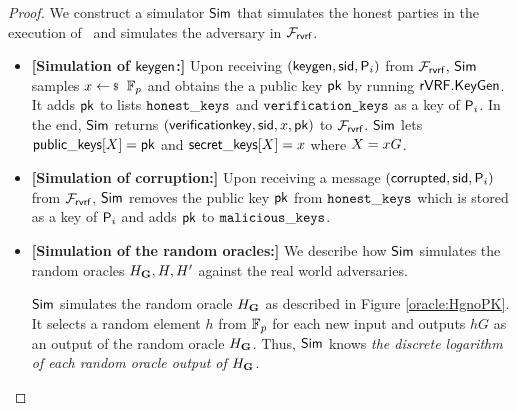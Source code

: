 \begin{proof}
	We construct a simulator $ \mathsf{Sim} $ that simulates the honest parties in the execution of \name \ and simulates the adversary in $ \mathcal{F}_{\textsf{rvrf}} $. 
	\begin{itemize}
		
		\item \textbf{[Simulation of $ \mathsf{keygen} $:]} Upon receiving $(\mathsf{keygen}, \textsf{sid}, \mathsf{P}_i)$ from $\mathcal{F}_{\textsf{rvrf}}$, $ \mathsf{Sim} $ samples $x \leftsample \FF_p$ and obtains the a public key $ \mathsf{pk} $ by running $ {\mathsf{rVRF}}.{\mathsf{KeyGen}} $. It adds $ \mathsf{pk} $ to lists $ \mathtt{honest\_keys} $ and $ \texttt{verification\_keys} $ as a key of $ \mathsf{P}_i $. 
		In the end, $ \mathsf{Sim} $ returns $(\mathsf{verificationkey}, \textsf{sid}, x,\mathsf{pk})$ to $\mathcal{F}_{\textsf{rvrf}}$. 
		$ \mathsf{Sim} $ lets  $ {\mathsf{public\_keys}}[X] = \mathsf{pk}$ and $ {\mathsf{secret\_keys}}[X] =x $ where $ X = x G $.
		
		\item \textbf{[Simulation of corruption:]} Upon receiving a message $ (\mathsf{corrupted}, \textsf{sid}, \mathsf{P}_i) $ from $ \mathcal{F}_{\textsf{rvrf}} $, $ \mathsf{Sim} $ removes the public key $ \mathsf{pk} $ from $ \mathtt{honest\_keys} $ which is stored as a key of $ \mathsf{P}_i $ and adds $ \mathsf{pk} $ to $ \mathtt{malicious\_keys} $.
		
		\item\textbf{[Simulation of the random oracles:]} We  describe how $ \mathsf{Sim} $ simulates the random oracles $ H_{\mathbf{G}}, H, H' $ against the real world adversaries. 	
		
		$ \mathsf{Sim} $ simulates the random oracle $ H_{\mathbf{G}} $ as described in Figure \ref{oracle:HgnoPK}. It selects a random element  $ h $ from $ \mathbb{F}_p $ for each new input and outputs $ hG $ as an output of the random oracle $ H_{\mathbf{G}} $. Thus, $ \mathsf{Sim} $ knows \emph{the discrete logarithm of each random oracle output of $H_{\mathbf{G}}  $}. 



\end{itemize}
\end{proof}
